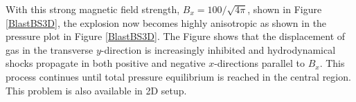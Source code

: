 With this strong magnetic field strength, $B_x=100/\sqrt{4\pi}$, shown in Figure {\ref{BlastBS3D}}, the explosion now becomes highly anisotropic as shown in the pressure plot in Figure {\ref{BlastBS3D}}. The Figure shows that the displacement of gas in the transverse $y$-direction is increasingly inhibited and hydrodynamical shocks propagate in both positive and negative $x$-directions parallel to $B_x$. This process continues until total pressure equilibrium is reached in the central region.
This problem is also available in 2D setup.



